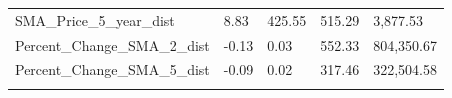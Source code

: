 \documentclass[]{article}
\begin{document}
\begin{longtable}[]{@{}lllll@{}}
\begin{minipage}[t]{0.49\columnwidth}\raggedright\strut
SMA\_Price\_5\_year\_dist\strut
\end{minipage} & \begin{minipage}[t]{0.08\columnwidth}\raggedright\strut
8.83\strut
\end{minipage} & \begin{minipage}[t]{0.09\columnwidth}\raggedright\strut
425.55\strut
\end{minipage} & \begin{minipage}[t]{0.09\columnwidth}\raggedright\strut
515.29\strut
\end{minipage} & \begin{minipage}[t]{0.11\columnwidth}\raggedright\strut
3,877.53\strut
\end{minipage}\tabularnewline
\begin{minipage}[t]{0.49\columnwidth}\raggedright\strut
Percent\_Change\_SMA\_2\_dist\strut
\end{minipage} & \begin{minipage}[t]{0.08\columnwidth}\raggedright\strut
-0.13\strut
\end{minipage} & \begin{minipage}[t]{0.09\columnwidth}\raggedright\strut
0.03\strut
\end{minipage} & \begin{minipage}[t]{0.09\columnwidth}\raggedright\strut
552.33\strut
\end{minipage} & \begin{minipage}[t]{0.11\columnwidth}\raggedright\strut
804,350.67\strut
\end{minipage}\tabularnewline
\begin{minipage}[t]{0.49\columnwidth}\raggedright\strut
Percent\_Change\_SMA\_5\_dist\strut
\end{minipage} & \begin{minipage}[t]{0.08\columnwidth}\raggedright\strut
-0.09\strut
\end{minipage} & \begin{minipage}[t]{0.09\columnwidth}\raggedright\strut
0.02\strut
\end{minipage} & \begin{minipage}[t]{0.09\columnwidth}\raggedright\strut
317.46\strut
\end{minipage} & \begin{minipage}[t]{0.11\columnwidth}\raggedright\strut
322,504.58\strut
\end{minipage}\tabularnewline
\begin{minipage}[t]{0.49\columnwidth}\raggedright\strut

\end{minipage}
\end{longtable}
\end{document}
